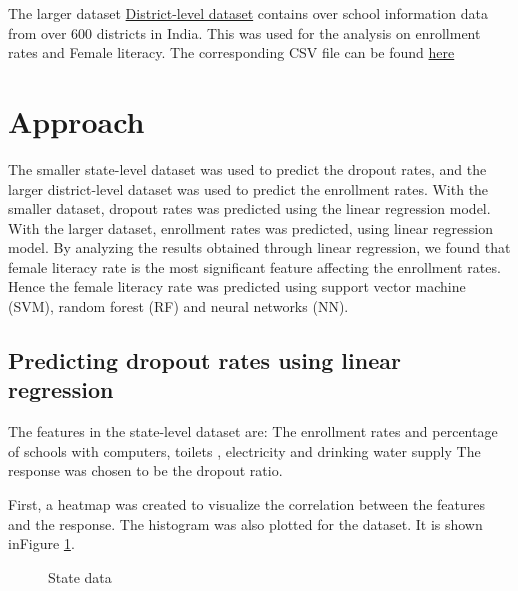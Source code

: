 \documentclass{article}
\begin{document}
The larger dataset \href{https://www.kaggle.com/rajanand/education-in-india}{District-level dataset} contains over school information data from over 600 districts in India. This was used for the analysis on enrollment rates and Female literacy. The corresponding CSV file can be found \href{https://uwprod-my.sharepoint.com/:u:/g/personal/ssridhara_wisc_edu/ERE1fkFjT1tPvzMqik46o1UBbDBkdWNj7p3jxP4TITbzuw?e=UcE0cs}{here}

\section{Approach}
The smaller state-level dataset was used to predict the dropout rates, and the larger district-level dataset was used to predict the enrollment rates. 
With the smaller dataset, dropout rates was predicted using the linear regression model. With the larger dataset, enrollment rates was predicted,  using linear regression model. By analyzing the results obtained through linear regression, we found that female literacy rate is the most significant feature affecting the enrollment rates. Hence the female literacy rate was predicted using support vector machine (SVM), random forest (RF) and neural networks (NN). 

\subsection{Predicting dropout rates using linear regression}
\label{sec:4.1}

The features in the state-level dataset are: The enrollment rates and percentage of schools with computers, toilets , electricity and drinking water supply
The response was chosen to be the dropout ratio. 

First, a heatmap was created to visualize the correlation between the features and the response. The histogram was also plotted for the dataset. It is shown inFigure \ref{fig:fig1}. 

\begin{figure}[h]
\centering
  \caption{State data}
  \label{fig:fig1}
\end{figure}
\end{document}
